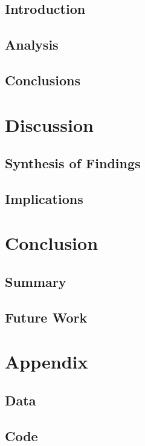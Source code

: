\documentclass[a4paper, english]{article}
\begin{document}
    \subsection{Introduction}
    \subsection{Analysis}
    \subsection{Conclusions}

\section{Discussion}
    \subsection{Synthesis of Findings}
    \subsection{Implications}

\section{Conclusion}
    \subsection{Summary}
    \subsection{Future Work}

\section{Appendix}
    \subsection{Data}
    \subsection{Code}
\end{document}
